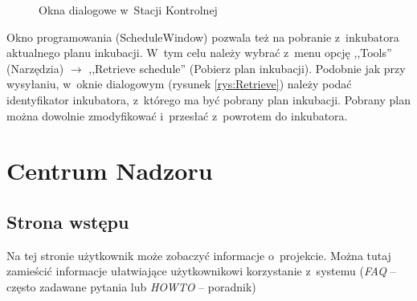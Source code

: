\begin{figure}[b]
	\centering
	\hfill
	\hfill

	\caption{Okna dialogowe w~Stacji Kontrolnej}
	\label{rys:dialogi}
\end{figure}

Okno programowania (ScheduleWindow) pozwala też na pobranie z~inkubatora
aktualnego planu inkubacji. W~tym celu należy wybrać z~menu opcję ,,Tools''
(Narzędzia) $\rightarrow$ ,,Retrieve schedule'' (Pobierz plan inkubacji).
Podobnie jak przy wysyłaniu, w~oknie dialogowym (rysunek \ref{rys:Retrieve})
należy podać identyfikator inkubatora, z~którego ma być pobrany plan inkubacji.
Pobrany plan można dowolnie zmodyfikować i~przesłać z~powrotem do inkubatora.

\section{Centrum Nadzoru}

\subsection{Strona wstępu}
Na tej stronie użytkownik może zobaczyć informacje o~projekcie. Można tutaj
zamieścić informacje ułatwiające użytkownikowi korzystanie z~systemu
(\emph{FAQ} -- często zadawane pytania lub \emph{HOWTO} -- poradnik)

